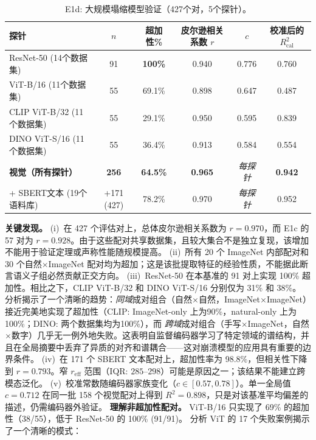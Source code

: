 \documentclass{article}
\newcommand{\reff}{\ensuremath{r_{\mathrm{eff}}}\xspace}
\begin{document}
\begin{table}[h]
\centering
\caption{E1d: 大规模塌缩模型验证（427个对，5个探针）。}
\small
\setlength{\tabcolsep}{3.5pt}
\begin{tabular}{lccccc}
\toprule
探针 & $n$ & 超加性\% & 皮尔逊相关系数 $r$ & $c$ & 校准后的 $R^2_{\mathrm{cal}}$ \\
\midrule
ResNet-50 (14个数据集)       & 91  & \textbf{100\%}   & 0.940 & 0.776 & 0.760 \\
ViT-B/16 (11个数据集)        & 55  & 69.1\%            & 0.898 & 0.647 & 0.487 \\
CLIP ViT-B/32 (11个数据集)    & 55  & 29.1\%            & 0.950 & 0.595 & 0.839 \\
DINO ViT-S/16 (11个数据集)    & 55  & 36.4\%            & 0.913 & 0.584 & 0.554 \\
\midrule
\textbf{视觉（所有探针）}   & \textbf{256} & \textbf{64.5\%} & \textbf{0.965} & \emph{每探针} & \textbf{0.942} \\
+ SBERT文本 (19个语料库)      & +171 (427)   & 78.2\%           & 0.970          & \emph{每探针} & 0.952 \\
\bottomrule
\end{tabular}\normalsize
\end{table}
\textbf{关键发现。}
(i)~在 427 个评估对上，总体皮尔逊相关系数为 $r=0.970$，而 E1c 的 57 对为 $r=0.928$。由于这些配对共享数据集，且较大集合不是独立复现，该增加不能用于验证定理或声称性能随规模提高。
(ii)~所有 20 个 ImageNet 内部配对和 30 个自然$\times$ImageNet 配对均为超加；这是该批提取特征的经验性质，不能据此断言语义子组必然贡献正交方向。
(iii)~ResNet-50 在本基准的 91 对上实现 100\% 超加性。相比之下，CLIP ViT-B/32 和 DINO ViT-S/16 分别仅为 31\% 和 38\%。
分析揭示了一个清晰的趋势：\emph{同域}成对组合（自然$\times$自然，ImageNet$\times$ImageNet）接近完美地实现了超加性（CLIP: ImageNet-only 上为90\%，natural-only 上为100\%；DINO: 两个数据集均为100\%），而 \emph{跨域}成对组合（手写$\times$ImageNet，自然$\times$数字）几乎无一例外地失败。这表明自监督编码器学习了特定领域的谱结构，并且在全局摘要中丢弃了异质的对齐和谱耦合——这对崩溃模型的应用具有重要的边界条件。
(iv)~在 171 个 SBERT 文本配对上，超加性率为 98.8\%，但相关性下降到 $r=0.793$。窄 $\reff$ 范围（IQR: $285$--$298$）可能是原因之一；该结果不能建立跨模态泛化。
(v)~校准常数随编码器家族变化（$c\in[0.57,0.78]$）。单一全局值 $c=0.712$ 在同一批 158 个视觉配对上得到 $R^2=0.898$，只是对该基准平均偏差的描述，仍需编码器外验证。
\textbf{理解非超加性配对。}
ViT-B/16 只实现了 69\% 的超加性（38/55），低于 ResNet-50 的 100\% (91/91)。
分析 ViT 的 17 个失败案例揭示了一个清晰的模式：
\end{document}
